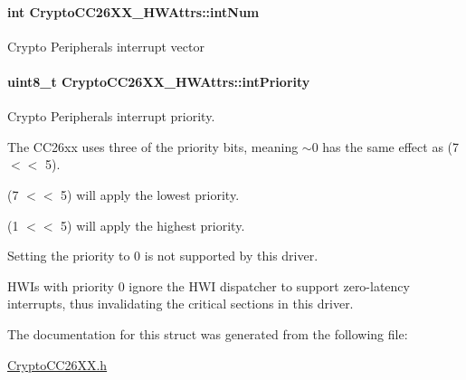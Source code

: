 \paragraph[{int\+Num}]{\setlength{\rightskip}{0pt plus 5cm}int Crypto\+C\+C26\+X\+X\+\_\+\+H\+W\+Attrs\+::int\+Num}\label{struct_crypto_c_c26_x_x___h_w_attrs_a63cdd84637d1e9acca0315cd96d9891b}
Crypto Peripheral\textquotesingle{}s interrupt vector 
\paragraph[{int\+Priority}]{\setlength{\rightskip}{0pt plus 5cm}uint8\+\_\+t Crypto\+C\+C26\+X\+X\+\_\+\+H\+W\+Attrs\+::int\+Priority}\label{struct_crypto_c_c26_x_x___h_w_attrs_af5d64e44258b27d68b380085544ab71f}


Crypto Peripheral\textquotesingle{}s interrupt priority. 

The C\+C26xx uses three of the priority bits, meaning $\sim$0 has the same effect as (7 $<$$<$ 5).

(7 $<$$<$ 5) will apply the lowest priority.

(1 $<$$<$ 5) will apply the highest priority.

Setting the priority to 0 is not supported by this driver.

H\+W\+I\textquotesingle{}s with priority 0 ignore the H\+W\+I dispatcher to support zero-\/latency interrupts, thus invalidating the critical sections in this driver. 

The documentation for this struct was generated from the following file\+:\begin{DoxyCompactItemize}
\item 
\hyperlink{_crypto_c_c26_x_x_8h}{Crypto\+C\+C26\+X\+X.\+h}\end{DoxyCompactItemize}
